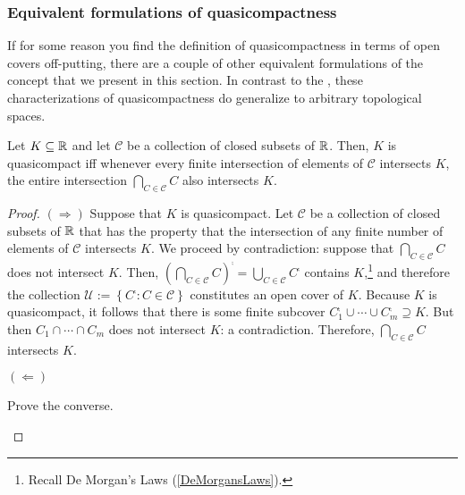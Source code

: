 \subsubsection{Equivalent formulations of quasicompactness}

If for some reason you find the definition of quasicompactness in terms of open covers off-putting, there are a couple of other equivalent formulations of the concept that we present in this section.  In contrast to the , these characterizations of quasicompactness do generalize to arbitrary topological spaces.
\begin{prp}\label{prp3.4.58}
\begin{savenotes}
Let $K\subseteq \mathbb{R}$ and let $\mathcal{C}$ be a collection of closed subsets of $\mathbb{R}$.  Then, $K$ is quasicompact iff whenever every finite intersection of elements of $\mathcal{C}$ intersects $K$, the entire intersection $\bigcap _{C\in \mathcal{C}}C$ also intersects $K$.
\begin{proof}
$(\Rightarrow )$ Suppose that $K$ is quasicompact.  Let $\mathcal{C}$ be a collection of closed subsets of $\mathbb{R}$ that has the property that the intersection of any finite number of elements of $\mathcal{C}$ intersects $K$.  We proceed by contradiction:  suppose that $\bigcap _{C\in \mathcal{C}}C$ does not intersect $K$.  Then, $\left( \bigcap _{C\in \mathcal{C}}C\right) ^{\comp}=\bigcup _{C\in \mathcal{C}}C^{\comp}$ contains $K$,\footnote{Recall De Morgan's Laws (\cref{DeMorgansLaws}).} and therefore the collection $\mathcal{U}:=\left\{ C^{\comp}:C\in \mathcal{C}\right\}$ constitutes an open cover of $K$.  Because $K$ is quasicompact, it follows that there is some finite subcover $C_1^{\comp}\cup \cdots \cup C_m^{\comp}\supseteq K$.  But then $C_1\cap \cdots \cap C_m$ does not intersect $K$:  a contradiction.  Therefore, $\bigcap _{C\in \mathcal{C}}C$ intersects $K$.

\blankline
\noindent
$(\Leftarrow )$
\begin{exr}
Prove the converse.
\end{exr}
\end{proof}
\end{savenotes}
\end{prp}
